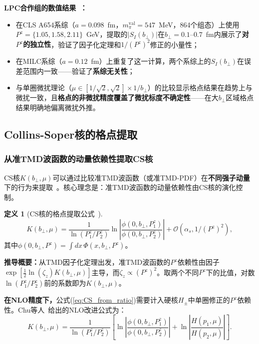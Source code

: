\documentclass[12pt,a4paper]{ctexart}
\theoremstyle{definition}
\newtheorem{definition}{定义}[section]
\begin{document}
\textbf{LPC合作组的数值结果~\cite{LPC2020soft,Chu2023soft}：}
\begin{itemize}
    \item 在CLS A654系综（$a = 0.098$~fm，$m_\pi^{\text{val}} = 547$~MeV，864个组态）上使用$P^z = \{1.05, 1.58, 2.11\}$~GeV，提取的$|S_I(b_\perp)|$在$b_\perp = 0.1\text{--}0.7$~fm内展示了\textbf{对$P^z$的独立性}，验证了因子化定理和$1/(P^z)^2$修正的小量性；
    \item 在MILC系综（$a = 0.12$~fm）上重复了这一计算，两个系综上的$S_I(b_\perp)$在误差范围内一致——验证了\textbf{系综无关性}；
    \item 与单圈微扰理论（$\mu \in [1/\sqrt{2}, \sqrt{2}] \times 1/b_\perp$）的比较显示格点结果在趋势上与微扰一致，且\textbf{格点的非微扰精度覆盖了微扰标度不确定性}——在大$b_\perp$区域格点结果明确地偏离微扰外推。
\end{itemize}

\subsection{Collins-Soper核的格点提取}

\subsubsection{从准TMD波函数的动量依赖性提取CS核}

CS核$K(b_\perp, \mu)$可以通过比较准TMD波函数（或准TMD-PDF）在\textbf{不同强子动量}下的行为来提取~\cite{LPC2020soft,Chu2022CSkernel,Chu2023soft}。核心理念是：准TMD波函数的动量依赖性由CS核的演化控制。

\begin{definition}[CS核的格点提取公式~\cite{Chu2022CSkernel}]
\begin{equation}
\boxed{K(b_\perp, \mu) = \frac{1}{\ln(P^z_1/P^z_2)} \ln\!\left| \frac{\phi(0, b_\perp, P^z_1)}{\phi(0, b_\perp, P^z_2)} \right| + \mathcal{O}(\alpha_s, 1/(P^z)^2)},
\label{eq:CS_from_ratio}
\end{equation}
其中$\phi(0, b_\perp, P^z) = \int dx\, \Phi(x, b_\perp, P^z)$。
\end{definition}

\textbf{推导概要：}从TMD因子化定理出发，准TMD波函数的$P^z$依赖性由因子$\exp[\frac{1}{2}\ln(\zeta_z)K(b_\perp, \mu)]$主导，而$\zeta_z \propto (P^z)^2$。取两个不同$P^z$下的比值，对数$\ln(P^z_1/P^z_2)$前的系数即为$K(b_\perp, \mu)$。

\textbf{在NLO精度下，}公式(\ref{eq:CS_from_ratio})需要计入硬核$H_\pm$中单圈修正的$P^z$依赖性。Chu等人~\cite{Chu2022CSkernel}给出的NLO改进公式为：
\begin{equation}
K(b_\perp, \mu) = \frac{1}{\ln(P^z_1/P^z_2)} \left[ \ln\!\left| \frac{\phi(0, b_\perp, P^z_1)}{\phi(0, b_\perp, P^z_2)} \right| + \ln\!\left| \frac{H(p_1, \mu)}{H(p_2, \mu)} \right| \right].
\label{eq:CS_NLO}
\end{equation}
\end{document}
